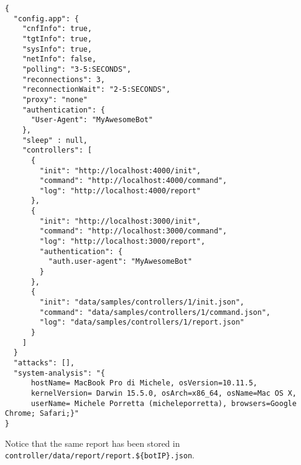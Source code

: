 \begin{verbatim}
{
  "config.app": {
    "cnfInfo": true,
    "tgtInfo": true,
    "sysInfo": true,
    "netInfo": false,
    "polling": "3-5:SECONDS",
    "reconnections": 3,
    "reconnectionWait": "2-5:SECONDS",
    "proxy": "none"
    "authentication": {
      "User-Agent": "MyAwesomeBot"
    },
    "sleep" : null,
    "controllers": [
      {
        "init": "http://localhost:4000/init",
        "command": "http://localhost:4000/command",
        "log": "http://localhost:4000/report"
      },
      {
        "init": "http://localhost:3000/init",
        "command": "http://localhost:3000/command",
        "log": "http://localhost:3000/report",
        "authentication": {
          "auth.user-agent": "MyAwesomeBot"
        }
      },
      {
        "init": "data/samples/controllers/1/init.json",
        "command": "data/samples/controllers/1/command.json",
        "log": "data/samples/controllers/1/report.json"
      }
    ]
  }
  "attacks": [],
  "system-analysis": "{
      hostName= MacBook Pro di Michele, osVersion=10.11.5,
      kernelVersion= Darwin 15.5.0, osArch=x86_64, osName=Mac OS X,
      userName= Michele Porretta (micheleporretta), browsers=Google Chrome; Safari;}"
}

\end{verbatim}

Notice that the same report has been stored in \texttt{controller/data/report/report.\$\{botIP\}.json}.
